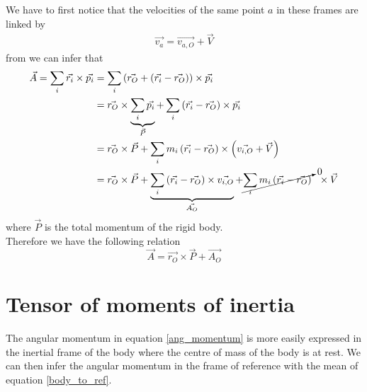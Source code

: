 \documentclass[class=report, float=false, crop=false]{standalone}
\begin{document}
We have to first notice that the velocities of the same point $a$ in these frames are linked by
\begin{align*}
\vec{v_a} = \vec{v_{a,O}} + \vec{V}
\end{align*}
from we can infer that
\begin{align*}
\vec{A} = \sum_i \vec{r_i} \times \vec{p_i} &= \sum_i \left(\vec{r_O} + \left(\vec{r_i} - \vec{r_O}\right)\right) \times \vec{p_i}\\
&= \vec{r_O} \times \underbrace{\sum_i \vec{p_i}}_{\vec{P}} + \sum_i \left(\vec{r_i} - \vec{r_O}\right) \times \vec{p_i}\\
&= \vec{r_O} \times \vec{P} + \sum_i m_i \left(\vec{r_i} - \vec{r_O}\right) \times \left(\vec{v_{i,O}} + \vec{V}\right)\\
&= \vec{r_O} \times \vec{P} + \underbrace{\sum_i \left(\vec{r_i} - \vec{r_O}\right) \times \vec{v_{i,O}}}_{\vec{A_O}} + \cancelto{0}{\sum_i m_i \left(\vec{r_i} - \vec{r_O}\right)}~~\times\vec{V}
\end{align*}
where $\vec{P}$ is the total momentum of the rigid body.\\

Therefore we have the following relation
\begin{equation}
\boxed{\vec{A} = \vec{r_O} \times \vec{P} + \vec{A_O}}
\label{body_to_ref}
\end{equation}

\section{Tensor of moments of inertia}

The angular momentum in equation \ref{ang_momentum} is more easily expressed in the inertial frame of the body where the centre of mass of the body is at rest. We can then infer the angular momentum in the frame of reference with the mean of equation \ref{body_to_ref}.\\
\end{document}

